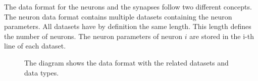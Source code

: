 The data format for the neurons and the synapses follow two different concepts.
The neuron data format contains multiple datasets containing the neuron parameters.
All datasets have by definition the same length. This length defines the number of neurons.
The neuron parameters of neuron $i$ are stored in the i-th line of each dataset.
\begin{figure}[ht!]
   	\begin{center}
        \hspace{1cm}
    	   \end{center}
    	\caption{%
        The diagram shows the data format with the related datasets and data types.
     }%
   \label{fig:atlas}
   \end{figure}
   
